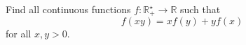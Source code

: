 Find all continuous functions $f : \mathbb{R}_+^\star \to \mathbb{R}$ such that
\[
f(xy) = xf(y) + yf(x)
\]
for all $x, y > 0$.
